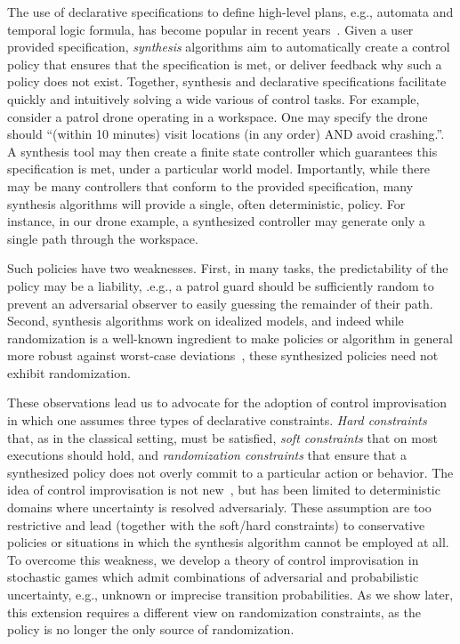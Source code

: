 The use of declarative specifications to define high-level plans, e.g.,
automata and temporal logic formula, has become popular in recent
years~\cite{DBLP:conf/iros/HorowitzWM14, DBLP:conf/rss/WongEK14, DBLP:conf/iros/HeLKV17, DBLP:conf/icra/FuATP16, DBLP:conf/icra/HeWKV19, DBLP:journals/arobots/MoarrefK20, DBLP:conf/icra/KantarosM0P20}.
Given a user provided specification, \emph{synthesis} algorithms aim
to automatically create a control policy that ensures that the
specification is met, or deliver feedback why such a policy does not
exist. Together, synthesis and declarative specifications facilitate
quickly and intuitively solving a wide various of control tasks.  For
example, consider a patrol drone operating in a workspace. One may
specify the drone should ``(within 10 minutes) visit locations (in any
order) AND avoid crashing.''. A synthesis tool may then create a
finite state controller which guarantees this specification is met,
under a particular world model.  
Importantly, while there may be many controllers
that conform to the provided specification, many synthesis algorithms
will provide a single, often deterministic, policy.  For instance, in
our drone example, a synthesized controller may generate only a
single path through the workspace.

Such policies have two weaknesses. First, in many tasks, the
predictability of the policy may be a liability, .e.g., a patrol guard
should be sufficiently random to prevent an adversarial observer to
easily guessing the remainder of their path. Second, synthesis
algorithms work on idealized models, and indeed while randomization is
a well-known ingredient to make policies or algorithm in general more
robust against worst-case
deviations~\cite{mceThesis, maxEntAnswer},
these synthesized policies need not exhibit randomization.

These observations lead us to advocate for the adoption of control
improvisation in which one assumes three types of declarative
constraints. \emph{Hard constraints} that, as in the classical
setting, must be satisfied, \emph{soft constraints} that on most
executions should hold, and \emph{randomization constraints} that
ensure that a synthesized policy does not overly commit to a
particular action or behavior. The idea of control improvisation is
not new~\cite{DBLP:conf/cav/FremontS18,DBLP:conf/fsttcs/FremontDSW15},
but has been limited to deterministic domains where uncertainty is
resolved adversarialy. These assumption are too restrictive and lead
(together with the soft/hard constraints) to conservative policies or
situations in which the synthesis algorithm cannot be employed at
all. To overcome this weakness, we develop a theory of control
improvisation in stochastic games which admit combinations of
adversarial and probabilistic uncertainty, e.g., unknown or imprecise
transition probabilities. As we show later, this extension requires a
different view on randomization constraints, as the policy is no
longer the only source of randomization.

